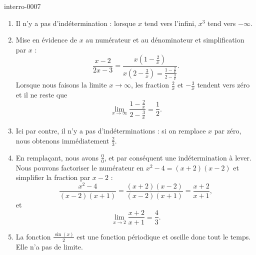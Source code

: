 
\begin{corrige}{interro-0007}

	\begin{enumerate}
		\item
			Il n'y a pas d'indétermination : lorsque $x$ tend vers l'infini, $x^3$ tend vers $-\infty$.
		\item
			Mise en évidence de $x$ au numérateur et au dénominateur et simplification par $x$ :
			\begin{equation}
				\frac{ x-2 }{ 2x-3 }=\frac{ x\left( 1-\frac{ 2 }{ x } \right) }{ x\left( 2-\frac{ 3 }{ x } \right)=\frac{ 1-\frac{ 2 }{ x } }{ 2-\frac{ 3 }{ x } } }.
			\end{equation}
			Lorsque nous faisons la limite $x\to \infty$, les fraction $\frac{ 2 }{ x }$ et $-\frac{ 3 }{ x }$ tendent vers zéro et il ne reste que
			\begin{equation}
				\lim_{x\to \infty} \frac{ 1-\frac{ 2 }{ x } }{ 2-\frac{ 3 }{ x } }=\frac{ 1 }{2}.
			\end{equation}
		\item
			Ici par contre, il n'y a pas d'indéterminations : si on remplace $x$ par zéro, nous obtenons immédiatement $\frac{ 2 }{ 3 }$.
		\item
			En remplaçant, nous avons $\frac{ 0 }{ 0 }$, et par conséquent une indétermination à lever. Nous pouvons factoriser le numérateur en $x^2-4=(x+2)(x-2)$ et simplifier la fraction par $x-2$ :
			\begin{equation}
				\frac{ x^2-4 }{ (x-2)(x+1) }=\frac{ (x+2)(x-2) }{ (x-2)(x+1) }=\frac{ x+2 }{ x+1 },
			\end{equation}
			et
			\begin{equation}
				\lim_{x\to 2} \frac{ x+2 }{ x+1 }=\frac{ 4 }{ 3 }.
			\end{equation}
		\item
			La fonction $\frac{ \sin(x) }{2}$ est une fonction périodique et oscille donc tout le temps. Elle n'a pas de limite.
	\end{enumerate}

\end{corrige}
